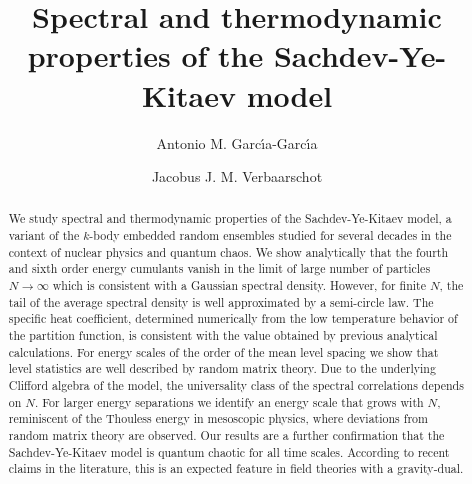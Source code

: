 \documentclass[aps,showpacs,floatfix,superscriptaddress,pre,11pt]{revtex4-1}
\begin{document}
\title{Spectral and thermodynamic properties of the Sachdev-Ye-Kitaev model}
\author{Antonio M. Garc\'\i a-Garc\'\i a}
\author{Jacobus J. M. Verbaarschot}
\begin{abstract} 
  We study spectral and thermodynamic properties of the Sachdev-Ye-Kitaev model, a variant of the $k$-body embedded random ensembles studied for several decades in the context of nuclear physics and quantum chaos. We show analytically that the fourth
  and sixth order energy cumulants vanish in the limit of large number of particles $N \to \infty$ which is consistent with a Gaussian spectral density. However, for finite $N$, the tail of the average spectral density is well approximated by a  
  semi-circle law. The specific heat coefficient, determined numerically from the low temperature behavior of the partition function, 
is consistent with the value obtained by previous analytical calculations. For energy scales of the order of the mean level spacing we show that level statistics are well described by random matrix theory. Due to the underlying Clifford algebra of the model, the universality class of the spectral correlations depends on $N$. For larger energy separations we identify an energy scale that grows with $N$, reminiscent of the Thouless energy in mesoscopic physics, where deviations from random matrix theory are observed. Our results are a further confirmation that the Sachdev-Ye-Kitaev model is quantum chaotic for all time scales.
 According to recent claims in the literature, this is an expected feature in field theories with a gravity-dual. 
 
\end{abstract}


\maketitle
\end{document}
